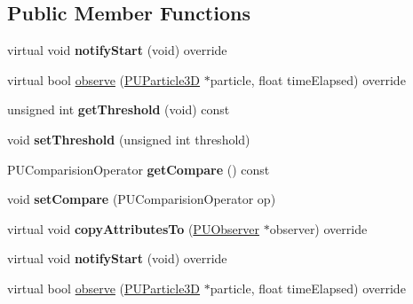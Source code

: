 \subsection*{Public Member Functions}
\begin{DoxyCompactItemize}
\item 
\mbox{\label{classPUOnCountObserver_aadcee88e08cf0c166c729d5de5e7b1b9}} 
virtual void {\bfseries notify\+Start} (void) override
\item 
virtual bool \hyperlink{classPUOnCountObserver_a8f6c4a64fa9fc49264a5cb3430d04c27}{observe} (\hyperlink{structPUParticle3D}{P\+U\+Particle3D} $\ast$particle, float time\+Elapsed) override
\item 
\mbox{\label{classPUOnCountObserver_a7e53b19addde5049c8403e7a5cdfb8ca}} 
unsigned int {\bfseries get\+Threshold} (void) const
\item 
\mbox{\label{classPUOnCountObserver_ac9af2e3b1283dfeae568b9a8d9330c93}} 
void {\bfseries set\+Threshold} (unsigned int threshold)
\item 
\mbox{\label{classPUOnCountObserver_aba78df5e80e3afde464c30a85b76652c}} 
P\+U\+Comparision\+Operator {\bfseries get\+Compare} () const
\item 
\mbox{\label{classPUOnCountObserver_afefcffcb573ce28b5266a88226c189e9}} 
void {\bfseries set\+Compare} (P\+U\+Comparision\+Operator op)
\item 
\mbox{\label{classPUOnCountObserver_aebea42077b1aee672b526646c56a9ed5}} 
virtual void {\bfseries copy\+Attributes\+To} (\hyperlink{classPUObserver}{P\+U\+Observer} $\ast$observer) override
\item 
\mbox{\label{classPUOnCountObserver_aa80d40bc852dcbce7db8e9697bc73a10}} 
virtual void {\bfseries notify\+Start} (void) override
\item 
virtual bool \hyperlink{classPUOnCountObserver_ae183110704061276d72a79b3c746677f}{observe} (\hyperlink{structPUParticle3D}{P\+U\+Particle3D} $\ast$particle, float time\+Elapsed) override
\item 
\mbox{\label{classPUOnCountObserver_a7e53b19addde5049c8403e7a5cdfb8ca}} 

\end{DoxyCompactItemize}
